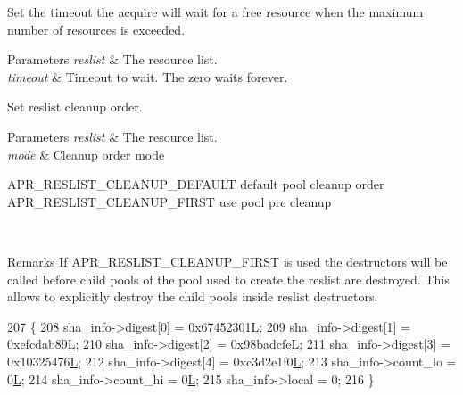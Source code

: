 Set the timeout the acquire will wait for a free resource when the maximum number of resources is exceeded. 
\begin{DoxyParams}{Parameters}
{\em reslist} & The resource list. \\
\hline
{\em timeout} & Timeout to wait. The zero waits forever.\\
\hline
\end{DoxyParams}
Set reslist cleanup order. 
\begin{DoxyParams}{Parameters}
{\em reslist} & The resource list. \\
\hline
{\em mode} & Cleanup order mode 
\begin{DoxyPre}
          APR\_RESLIST\_CLEANUP\_DEFAULT  default pool cleanup order
          APR\_RESLIST\_CLEANUP\_FIRST    use pool pre cleanup
\end{DoxyPre}
 \\
\hline
\end{DoxyParams}
\begin{DoxyRemark}{Remarks}
If A\+P\+R\+\_\+\+R\+E\+S\+L\+I\+S\+T\+\_\+\+C\+L\+E\+A\+N\+U\+P\+\_\+\+F\+I\+R\+ST is used the destructors will be called before child pools of the pool used to create the reslist are destroyed. This allows to explicitly destroy the child pools inside reslist destructors. 
\end{DoxyRemark}

\begin{DoxyCode}
207 \{
208     sha\_info->digest[0] = 0x67452301\hyperlink{mod__lua_8h_a62f94dfc0036bec0c14106c2f15caf3e}{L};
209     sha\_info->digest[1] = 0xefcdab89\hyperlink{mod__lua_8h_a62f94dfc0036bec0c14106c2f15caf3e}{L};
210     sha\_info->digest[2] = 0x98badcfe\hyperlink{mod__lua_8h_a62f94dfc0036bec0c14106c2f15caf3e}{L};
211     sha\_info->digest[3] = 0x10325476\hyperlink{mod__lua_8h_a62f94dfc0036bec0c14106c2f15caf3e}{L};
212     sha\_info->digest[4] = 0xc3d2e1f0\hyperlink{mod__lua_8h_a62f94dfc0036bec0c14106c2f15caf3e}{L};
213     sha\_info->count\_lo = 0\hyperlink{mod__lua_8h_a62f94dfc0036bec0c14106c2f15caf3e}{L};
214     sha\_info->count\_hi = 0\hyperlink{mod__lua_8h_a62f94dfc0036bec0c14106c2f15caf3e}{L};
215     sha\_info->local = 0;
216 \}
\end{DoxyCode}
